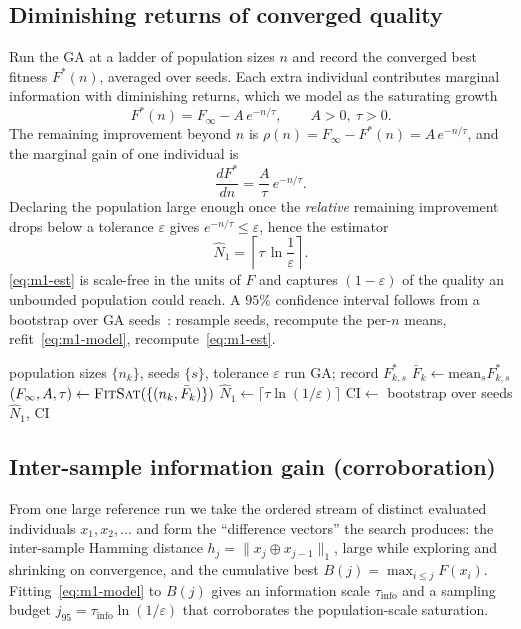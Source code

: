 \documentclass[conference]{IEEEtran}
\newcommand{\Nhat}{\hat{N}}
\begin{document}
\subsection{Diminishing returns of converged quality}
Run the GA at a ladder of population sizes $n$ and record the converged best
fitness $F^*(n)$, averaged over seeds. Each extra individual contributes
marginal information with diminishing returns, which we model as the saturating
growth
\begin{equation}
F^*(n) = F_\infty - A\,e^{-n/\tau}, \qquad A>0,\ \tau>0.
\label{eq:m1-model}
\end{equation}
The remaining improvement beyond $n$ is $\rho(n)=F_\infty-F^*(n)=A\,e^{-n/\tau}$,
and the marginal gain of one individual is
\begin{equation}
\frac{dF^*}{dn} = \frac{A}{\tau}\,e^{-n/\tau}.
\label{eq:m1-marginal}
\end{equation}
Declaring the population large enough once the \emph{relative} remaining
improvement drops below a tolerance $\varepsilon$ gives
$e^{-n/\tau}\le\varepsilon$, hence the estimator
\begin{equation}
\boxed{\;\Nhat_1 = \left\lceil \tau\,\ln\!\frac{1}{\varepsilon}\right\rceil.\;}
\label{eq:m1-est}
\end{equation}
\autoref{eq:m1-est} is scale-free in the units of $F$ and captures
$(1-\varepsilon)$ of the quality an unbounded population could reach. A
$95\%$ confidence interval follows from a bootstrap over GA
seeds~\cite{efron1993bootstrap}: resample seeds, recompute the per-$n$ means,
refit~\eqref{eq:m1-model}, recompute~\eqref{eq:m1-est}.

\begin{algorithm}[!t]
\caption{Method 1 estimate}
\label{alg:m1}
\begin{algorithmic}[1]
\Require population sizes $\{n_k\}$, seeds $\{s\}$, tolerance $\varepsilon$
 run GA; record $F^*_{k,s}$ \EndFor
\State $\bar F_k \gets \mathrm{mean}_s F^*_{k,s}$
\State $(F_\infty, A, \tau) \gets \textsc{FitSat}(\{(n_k,\bar F_k)\})$
\State $\Nhat_1 \gets \lceil \tau\ln(1/\varepsilon)\rceil$
\State $\mathrm{CI} \gets$ bootstrap over seeds
\State \Return $\Nhat_1$, CI
\end{algorithmic}
\end{algorithm}

\subsection{Inter-sample information gain (corroboration)}
From one large reference run we take the ordered stream of distinct evaluated
individuals $x_1,x_2,\dots$ and form the ``difference vectors'' the search
produces: the inter-sample Hamming distance $h_j=\lVert x_j\oplus x_{j-1}\rVert_1$,
large while exploring and shrinking on convergence, and the cumulative best
$B(j)=\max_{i\le j}F(x_i)$. Fitting~\eqref{eq:m1-model} to $B(j)$ gives an
information scale $\tau_{\mathrm{info}}$ and a sampling budget
$j_{95}=\tau_{\mathrm{info}}\ln(1/\varepsilon)$ that corroborates the
population-scale saturation.
\end{document}
